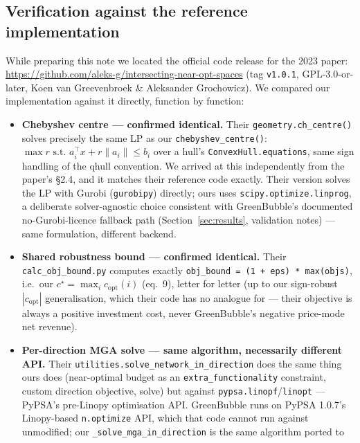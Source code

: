 \documentclass[11pt]{article}
\begin{document}
\subsection{Verification against the reference implementation}
\label{sec:verification}
While preparing this note we located the official code release for the 2023
paper: \url{https://github.com/aleks-g/intersecting-near-opt-spaces}
(tag \texttt{v1.0.1}, GPL-3.0-or-later, Koen van Greevenbroek \& Aleksander
Grochowicz). We compared our implementation against it directly,
function by function:
\begin{itemize}[leftmargin=1.4em]
  \item \textbf{Chebyshev centre --- confirmed identical.} Their
    \texttt{geometry.ch\_centre()} solves precisely the same LP as our
    \texttt{chebyshev\_centre()}: \mbox{$\max r \text{ s.t. }
    a_i^\top x + r\lVert a_i\rVert \le b_i$} over a hull's
    \texttt{ConvexHull.equations}, same sign handling of the qhull
    convention. We arrived at this independently from the paper's \S 2.4,
    and it matches their reference code exactly. Their version solves the
    LP with Gurobi (\texttt{gurobipy}) directly; ours uses
    \texttt{scipy.optimize.linprog}, a deliberate solver-agnostic choice
    consistent with GreenBubble's documented no-Gurobi-licence fallback path
    (Section~\ref{sec:results}, validation notes) --- same formulation,
    different backend.
  \item \textbf{Shared robustness bound --- confirmed identical.} Their
    \texttt{calc\_obj\_bound.py} computes exactly
    \texttt{obj\_bound = (1 + eps) * max(objs)}, i.e.\ our
    $c^\star = \max_i c_{\mathrm{opt}}(i)$ (eq.\ 9), letter for letter (up
    to our sign-robust $|c_{\mathrm{opt}}|$ generalisation, which their code
    has no analogue for --- their objective is always a positive investment
    cost, never GreenBubble's negative price-mode net revenue).
  \item \textbf{Per-direction MGA solve --- same algorithm, necessarily
    different API.} Their \texttt{utilities}\allowbreak\texttt{.solve\_network\_in\_direction}
    does the same thing ours does (near-optimal budget as an
    \texttt{extra\_functionality} constraint, custom direction objective,
    solve) but against \texttt{pypsa.linopf}/\texttt{linopt} --- PyPSA's
    pre-Linopy optimisation API. GreenBubble runs on PyPSA 1.0.7's Linopy-based
    \texttt{n.optimize} API, which that code cannot run against unmodified;
    our \texttt{\_solve\_mga\_in\_direction} is the same algorithm ported to

\end{itemize}
\end{document}
